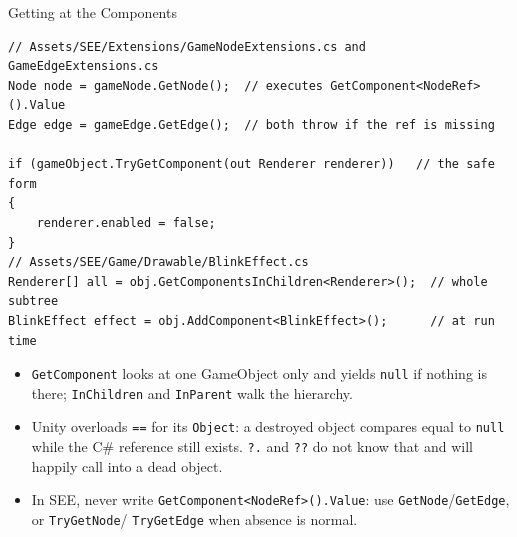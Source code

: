 \begin{frame}[fragile]{Getting at the Components}
  \begin{lstlisting}[basicstyle=\scriptsize\ttfamily]
// Assets/SEE/Extensions/GameNodeExtensions.cs and GameEdgeExtensions.cs
Node node = gameNode.GetNode();  // executes GetComponent<NodeRef>().Value
Edge edge = gameEdge.GetEdge();  // both throw if the ref is missing

if (gameObject.TryGetComponent(out Renderer renderer))   // the safe form
{
    renderer.enabled = false;
}
// Assets/SEE/Game/Drawable/BlinkEffect.cs
Renderer[] all = obj.GetComponentsInChildren<Renderer>();  // whole subtree
BlinkEffect effect = obj.AddComponent<BlinkEffect>();      // at run time
  \end{lstlisting}
  \vspace{1ex}

  \begin{itemize}
    \item \texttt{GetComponent} looks at one GameObject only and yields
      \texttt{null} if nothing is there; \texttt{InChildren} and
      \texttt{InParent} walk the hierarchy.
    \item Unity overloads \texttt{==} for its \texttt{Object}: a destroyed
      object compares equal to \texttt{null} while the C\# reference still
      exists. \texttt{?.} and \texttt{??} do not know that and will happily
      call into a dead object.
    \item In SEE, never write \texttt{GetComponent<NodeRef>().Value}: use
      \texttt{GetNode}/\texttt{GetEdge}, or \texttt{TryGetNode}/%
      \texttt{TryGetEdge} when absence is normal.
  \end{itemize}
\end{frame}

